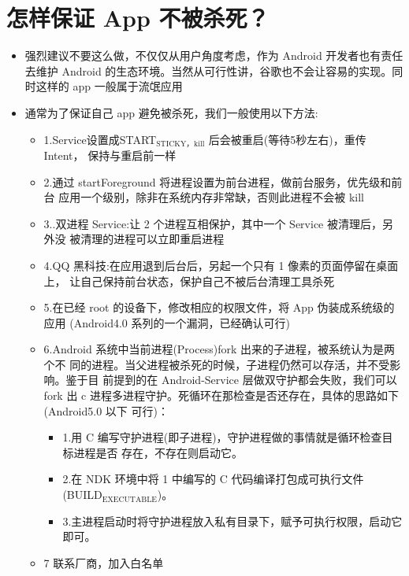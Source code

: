 \documentclass[9pt, b5paper]{article}
\begin{document}
\section{怎样保证 App 不被杀死？}
\label{sec-14}
\begin{itemize}
\item 强烈建议不要这么做，不仅仅从用户角度考虑，作为 Android 开发者也有责任去维护 Android 的生态环境。当然从可行性讲，谷歌也不会让容易的实现。同 时这样的 app 一般属于流氓应用
\item 通常为了保证自己 app 避免被杀死，我们一般使用以下方法:
\begin{itemize}
\item 1.Service设置成START$_{\text{STICKY，kill}}$ 后会被重启(等待5秒左右)，重传Intent， 保持与重启前一样
\item 2.通过 startForeground 将进程设置为前台进程，做前台服务，优先级和前台 应用一个级别，除非在系统内存非常缺，否则此进程不会被 kill
\item 3..双进程 Service:让 2 个进程互相保护，其中一个 Service 被清理后，另外没 被清理的进程可以立即重启进程
\item 4.QQ 黑科技:在应用退到后台后，另起一个只有 1 像素的页面停留在桌面上， 让自己保持前台状态，保护自己不被后台清理工具杀死
\item 5.在已经 root 的设备下，修改相应的权限文件，将 App 伪装成系统级的应用 (Android4.0 系列的一个漏洞，已经确认可行)
\item 6.Android 系统中当前进程(Process)fork 出来的子进程，被系统认为是两个不 同的进程。当父进程被杀死的时候，子进程仍然可以存活，并不受影响。鉴于目 前提到的在 Android-Service 层做双守护都会失败，我们可以 fork 出 c 进程多进程守护。死循环在那检查是否还存在，具体的思路如下(Android5.0 以下 可行)：
\begin{itemize}
\item 1.用 C 编写守护进程(即子进程)，守护进程做的事情就是循环检查目标进程是否 存在，不存在则启动它。
\item 2.在 NDK 环境中将 1 中编写的 C 代码编译打包成可执行文件 (BUILD$_{\text{EXECUTABLE}}$)。
\item 3.主进程启动时将守护进程放入私有目录下，赋予可执行权限，启动它即可。
\end{itemize}
\item 7 联系厂商，加入白名单
\end{itemize}
\end{itemize}
\end{document}

